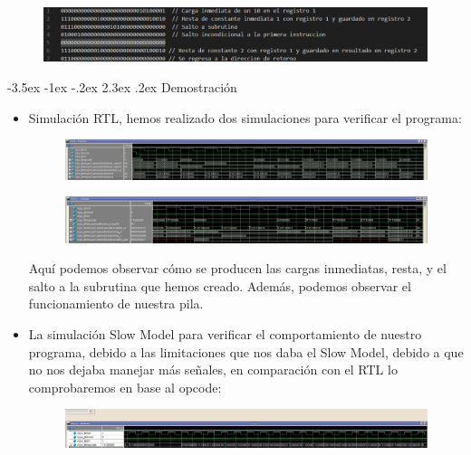 \documentclass[11pt]{report}
\makeatletter
\renewcommand\chapter{\@startsection{chapter}{0}{\z@}%
    {-3.5ex \@plus -1ex \@minus -.2ex}%
    {2.3ex \@plus.2ex}%
    {\normalfont\Large\bfseries}}
\makeatother
\begin{document}
\begin{figure}[H]
  \centering
  \includegraphics[width=1\textwidth]{img/Programa.png}
\end{figure}


\chapter{Demostración}
\begin{itemize}
  \item Simulación RTL, hemos realizado dos simulaciones para verificar el programa:
  \begin{figure}[H]
    \centering
    \includegraphics[width=1\textwidth]{img/error_prueba_ejemplos_TCM1.jpeg}
  \end{figure}
  
  \begin{figure}[H]
    \centering
    \includegraphics[width=1\textwidth]{img/segundaSimRTL.jpeg}
  \end{figure}
  
  Aquí podemos observar cómo se producen las cargas inmediatas, resta, y el salto a la subrutina que hemos creado. Además, podemos observar el funcionamiento de nuestra pila.

  \item La simulación Slow Model para verificar el comportamiento de nuestro programa, debido a las limitaciones que nos daba el Slow Model, debido a que no nos dejaba manejar más señales, en comparación con el RTL lo comprobaremos en base al opcode:
  \begin{figure}[H]
    \centering
    \includegraphics[width=1\textwidth]{img/SlowModel.jpeg}
  \end{figure}


\end{itemize}
\end{document}

